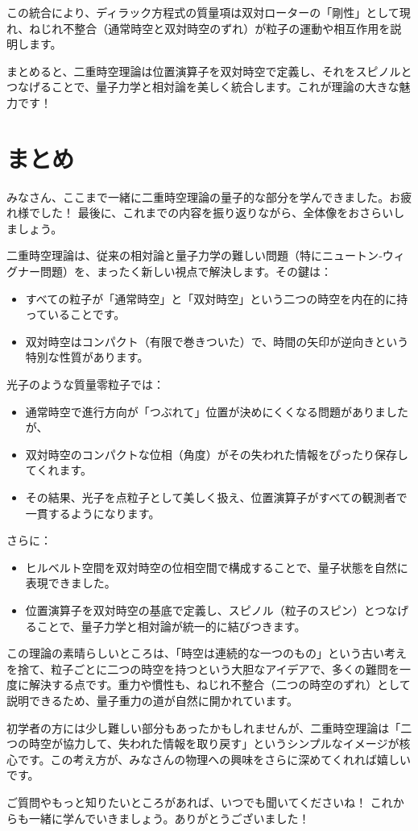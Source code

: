 \documentclass[dvipdfmx,12pt,a4paper]{article}
\begin{document}
この統合により、ディラック方程式の質量項は双対ローターの「剛性」として現れ、ねじれ不整合（通常時空と双対時空のずれ）が粒子の運動や相互作用を説明します。

まとめると、二重時空理論は位置演算子を双対時空で定義し、それをスピノルとつなげることで、量子力学と相対論を美しく統合します。これが理論の大きな魅力です！

\section{まとめ}

みなさん、ここまで一緒に二重時空理論の量子的な部分を学んできました。お疲れ様でした！ 最後に、これまでの内容を振り返りながら、全体像をおさらいしましょう。

二重時空理論は、従来の相対論と量子力学の難しい問題（特にニュートン‐ウィグナー問題）を、まったく新しい視点で解決します。その鍵は：
\begin{itemize}
  \item すべての粒子が「通常時空」と「双対時空」という二つの時空を内在的に持っていることです。
  \item 双対時空はコンパクト（有限で巻きついた）で、時間の矢印が逆向きという特別な性質があります。
\end{itemize}

光子のような質量零粒子では：
\begin{itemize}
  \item 通常時空で進行方向が「つぶれて」位置が決めにくくなる問題がありましたが、
  \item 双対時空のコンパクトな位相（角度）がその失われた情報をぴったり保存してくれます。
  \item その結果、光子を点粒子として美しく扱え、位置演算子がすべての観測者で一貫するようになります。
\end{itemize}

さらに：
\begin{itemize}
  \item ヒルベルト空間を双対時空の位相空間で構成することで、量子状態を自然に表現できました。
  \item 位置演算子を双対時空の基底で定義し、スピノル（粒子のスピン）とつなげることで、量子力学と相対論が統一的に結びつきます。
\end{itemize}

この理論の素晴らしいところは、「時空は連続的な一つのもの」という古い考えを捨て、粒子ごとに二つの時空を持つという大胆なアイデアで、多くの難問を一度に解決する点です。重力や慣性も、ねじれ不整合（二つの時空のずれ）として説明できるため、量子重力の道が自然に開かれています。

初学者の方には少し難しい部分もあったかもしれませんが、二重時空理論は「二つの時空が協力して、失われた情報を取り戻す」というシンプルなイメージが核心です。この考え方が、みなさんの物理への興味をさらに深めてくれれば嬉しいです。

ご質問やもっと知りたいところがあれば、いつでも聞いてくださいね！ これからも一緒に学んでいきましょう。ありがとうございました！
\end{document}
